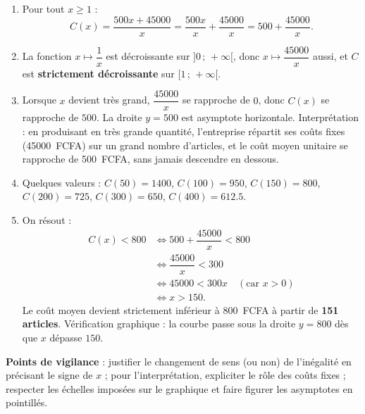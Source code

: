 \documentclass[11pt]{article}
\newcommand{\legende}[1]{\par\vspace{6pt}{\popsemi\fontsize{9}{11.5}\selectfont\color{popmuted}#1}}
\begin{document}
\begin{corrige}
\begin{enumerate}
\item Pour tout $x\geq 1$ :
\[C(x)=\dfrac{500x+45000}{x}=\dfrac{500x}{x}+\dfrac{45000}{x}=500+\dfrac{45000}{x}.\]
\item La fonction $x\mapsto\dfrac{1}{x}$ est décroissante sur $]0\,;\,+\infty[$, donc $x\mapsto\dfrac{45000}{x}$ aussi, et $C$ est \textbf{strictement décroissante} sur $[1\,;\,+\infty[$.
\item Lorsque $x$ devient très grand, $\dfrac{45000}{x}$ se rapproche de $0$, donc $C(x)$ se rapproche de $500$. La droite $y=500$ est asymptote horizontale. Interprétation : en produisant en très grande quantité, l'entreprise répartit ses coûts fixes (\SI{45000}{FCFA}) sur un grand nombre d'articles, et le coût moyen unitaire se rapproche de \SI{500}{FCFA}, sans jamais descendre en dessous.
\item Quelques valeurs : $C(50)=1400$, $C(100)=950$, $C(150)=800$, $C(200)=725$, $C(300)=650$, $C(400)=612.5$.
\begin{popfigure}
\legende{Coût moyen $C(x)=500+\dfrac{45000}{x}$ pour $50\leq x\leq 400$}
\end{popfigure}
\item On résout :
\begin{align*}
C(x)<800 &\iff 500+\dfrac{45000}{x}<800\\
&\iff \dfrac{45000}{x}<300\\
&\iff 45000<300x \quad(\text{car }x>0)\\
&\iff x>150.
\end{align*}
Le coût moyen devient strictement inférieur à \SI{800}{FCFA} à partir de \textbf{151 articles}. Vérification graphique : la courbe passe sous la droite $y=800$ dès que $x$ dépasse $150$.
\end{enumerate}
\textbf{Points de vigilance} : justifier le changement de sens (ou non) de l'inégalité en précisant le signe de $x$ ; pour l'interprétation, expliciter le rôle des coûts fixes ; respecter les échelles imposées sur le graphique et faire figurer les asymptotes en pointillés.
\end{corrige}
\end{document}
